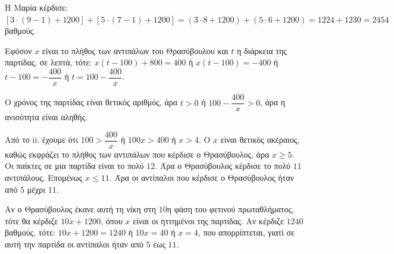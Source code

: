 
\begin{alist}
\item Η Μαρία κέρδισε:
$[3 \cdot (9 - 1) + 1200] + [5 \cdot (7 - 1) + 1200] = (3 \cdot 8 + 1200) + (5 \cdot 6 + 1200) = 1224 + 1230 = 2454$ βαθμούς.

\item
\begin{rlist}
\item Εφόσον $x$ είναι το πλήθος των αντιπάλων του Θρασύβουλου και $t$ η διάρκεια της παρτίδας, σε λεπτά, τότε:
$x(t - 100) + 800 = 400$ ή $x(t - 100) = -400$ ή $t - 100 = -\dfrac{400}{x}$ ή $t = 100 - \dfrac{400}{x}$.

\item Ο χρόνος της παρτίδας είναι θετικός αριθμός, άρα $t > 0$ ή $100 - \dfrac{400}{x} > 0$, άρα η ανισότητα είναι αληθής.

\item Από το ii. έχουμε ότι $100 > \dfrac{400}{x}$ ή $100x > 400$ ή $x > 4$.
Ο $x$ είναι θετικός ακέραιος, καθώς εκφράζει το πλήθος των αντιπάλων που κέρδισε ο Θρασύβουλος, άρα $x \ge 5$.
Οι παίκτες σε μια παρτίδα είναι το πολύ $12$. Άρα ο Θρασύβουλος κέρδισε το πολύ $11$ αντιπάλους. Επομένως $x \le 11$.
Άρα οι αντίπαλοι που κέρδισε ο Θρασύβουλος ήταν από $5$ μέχρι $11$.

\item Αν ο Θρασύβουλος έκανε αυτή τη νίκη στη $10$η φάση του φετινού πρωταθλήματος, τότε θα κέρδιζε $10x + 1200$, όπου $x$ είναι οι ηττημένοι της παρτίδας.
Αν κέρδιζε $1240$ βαθμούς, τότε:
$10x + 1200 = 1240$ ή $10x = 40$ ή $x = 4$, που απορρίπτεται, γιατί σε αυτή την παρτίδα οι αντίπαλοι ήταν από $5$ έως $11$.
\end{rlist}
\end{alist}

